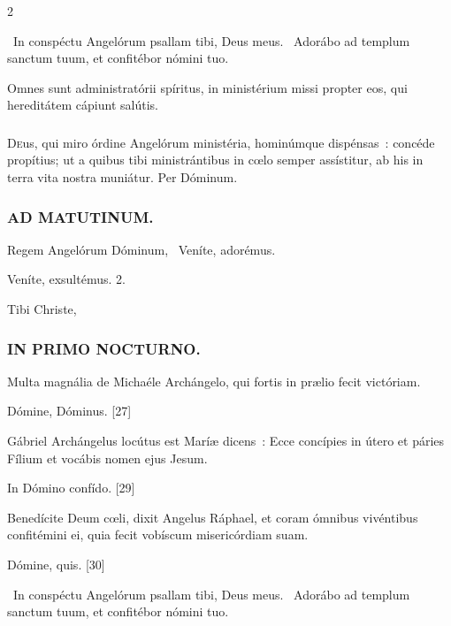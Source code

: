 \documentclass[9pt,twoside]{extarticle}
\begin{document}
\begin{multicols}{2}
{\begin{tightlist}{}
\item {}~In conspéctu Angelórum psallam tibi, Deus meus. ~Adorábo ad templum sanctum tuum, et confitébor nómini tuo.
\item {} Omnes sunt administratórii spíritus, in ministérium missi propter eos, qui hereditátem cápiunt salútis.
\end{tightlist}

\subsubsection*{\center {}}
\lettrine{D}eus, qui miro órdine Angelórum ministéria, hominúmque dispénsas~: concéde propítius; ut a quibus tibi ministrántibus in cœlo semper assístitur, ab his in terra vita nostra muniátur. Per Dóminum.

\subsubsection*{\center \textsc{AD MATUTINUM.}}
\begin{tightlist}{}
\item {} Regem Angelórum Dóminum, \textred{*}~Veníte, adorémus.
\item {} Veníte, exsultémus. 2.
\item {} Tibi Christe, 
\end{tightlist}

\subsubsection*{\center \textsc{IN PRIMO NOCTURNO.}}
\begin{tightlist}{}
\item {} Multa magnália de Michaéle Archángelo, qui fortis in prælio fecit victóriam.
\item {} Dómine, Dóminus. [27] 
\item {} Gábriel Archángelus locútus est Maríæ dicens~: Ecce concípies in útero et páries Fílium et vocábis nomen ejus Jesum.
\item {} In Dómino confído. [29]
\item {} Benedícite Deum cœli, dixit Angelus Ráphael, et coram ómnibus vivéntibus confitémini ei, quia fecit vobíscum misericórdiam suam.
\item {} Dómine, quis. [30]
\item {}~In conspéctu Angelórum psallam tibi, Deus meus. ~Adorábo ad templum sanctum tuum, et confitébor nómini tuo.
\item {}
\end{tightlist}

}
\end{multicols}
\end{document}
